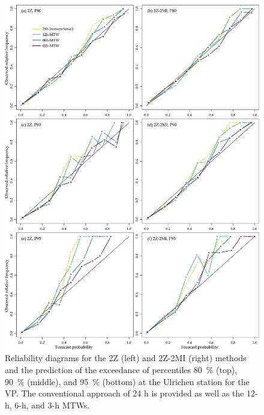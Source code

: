 \documentclass[hess, manuscript]{copernicus}
\begin{document}
	\begin{figure}[htb]
		\begin{center}
			\includegraphics[width=14cm]{fig12.pdf}
		\end{center}
		\caption{Reliability diagrams for the 2Z (left) and 2Z-2MI (right) methods and the prediction of the exceedance of percentiles 80~\% (top), 90~\% (middle), and 95~\% (bottom) at the Ulrichen station for the VP. The conventional approach of 24 h is provided as well as the 12-h, 6-h, and 3-h MTWs.}
		\label{fig:reliability_diagrams}
	\end{figure}
	
\end{document}

